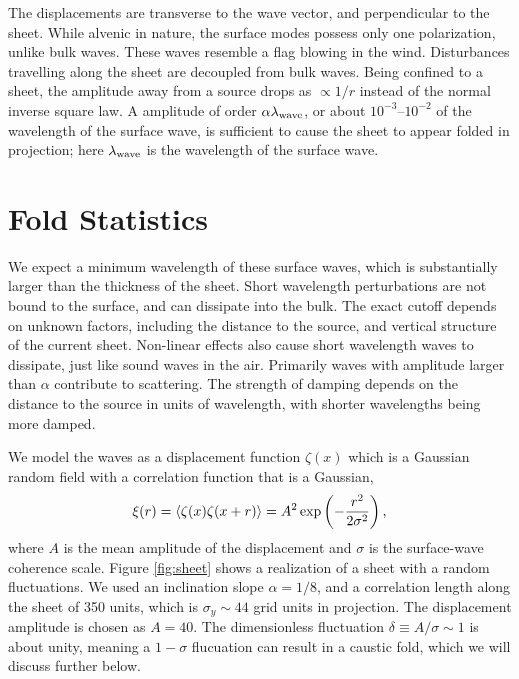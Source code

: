 \documentclass[useAMS,usenatbib]{mn2e}
\begin{document}
The displacements are
transverse to the wave vector, and perpendicular to the sheet.  While
alvenic in nature, the surface modes possess only one polarization,
unlike bulk waves.  These waves resemble a flag blowing in the wind.
Disturbances travelling along the sheet are decoupled from bulk waves.
Being confined to a sheet, the amplitude away from a source drops as
$\propto 1/r$ instead of the normal inverse square law.  A amplitude
of order $\alpha \lambda_{\rm wave}$,   or about $10^{-3}$--$10^{-2}$ of the wavelength
of the surface wave, is
sufficient to cause the sheet to appear folded in projection; here $\lambda_{\rm wave}$ is the wavelength of the surface wave.



\section{Fold Statistics}


We expect a minimum wavelength of these surface waves, which is
substantially larger than the thickness of the sheet.  Short
wavelength perturbations are not bound to the surface, and can
dissipate into the bulk.  The exact cutoff depends on unknown factors,
including the distance to the source, and vertical structure of the
current sheet.  Non-linear effects also cause short wavelength waves
to dissipate, just like sound waves in the air.  Primarily waves with
amplitude larger than $\alpha$ contribute to scattering.  The strength
of damping depends on the distance to the source in units of
wavelength, with shorter wavelengths being more damped.


We model the waves as a displacement function $\zeta(x)$
which is a Gaussian random field with a correlation function that is a
Gaussian, 
\begin{equation}
\xi(r)=\langle \zeta(x)
\zeta(x+r)\rangle=A^2\exp\left(-{r^2\over 2\sigma^2}\right),
\end{equation}
where $A$ is the mean amplitude
of the displacement and $\sigma$ is the surface-wave
coherence scale.  Figure \ref{fig:sheet} shows a realization of a
sheet with a random fluctuations.  We used an inclination slope
$\alpha=1/8$, and a correlation length along the sheet of 350 units,
which is $\sigma_y\sim 44$ grid units in projection.  The displacement
amplitude is chosen as $A=40$.  The dimensionless fluctuation
$\delta\equiv A/\sigma \sim 1$ is about unity, meaning a $1-\sigma$
flucuation can result in a caustic fold, which we will discuss further
below.
\end{document}
